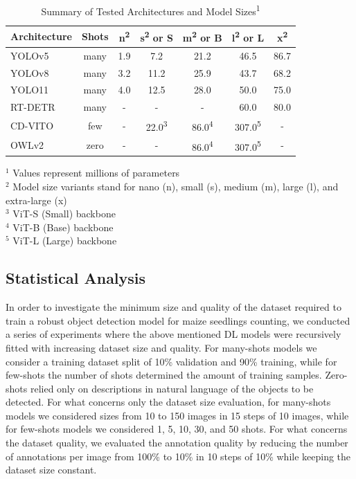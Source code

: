 \documentclass{article}
\begin{document}
\begin{table}[h]
  \caption{Summary of Tested Architectures and Model Sizes\textsuperscript{1}}
  \label{tab:architectures}
  \centering
  \begin{tabular}{lcccccc}
  \hline
  \textbf{Architecture} &\textbf{Shots} & \textbf{n\textsuperscript{2}} & \textbf{s\textsuperscript{2} or S} & \textbf{m\textsuperscript{2} or B} & \textbf{l\textsuperscript{2} or L} & \textbf{x\textsuperscript{2}} \\
  \hline
  YOLOv5 & many & 1.9 & 7.2 & 21.2 & 46.5 & 86.7 \\
  YOLOv8 & many & 3.2 & 11.2 & 25.9 & 43.7 & 68.2 \\
  YOLO11 & many & 4.0 & 12.5 & 28.0 & 50.0 & 75.0 \\
  RT-DETR & many & - & - & - & 60.0 & 80.0 \\
  CD-VITO & few & - & 22.0\textsuperscript{3} & 86.0\textsuperscript{4} & 307.0\textsuperscript{5} & - \\
  OWLv2 & zero & - & - & 86.0\textsuperscript{4} & 307.0\textsuperscript{5} & - \\
  \hline
  \end{tabular}
  
  \footnotesize{$^1$ Values represent millions of parameters\\
  $^2$ Model size variants stand for nano (n), small (s), medium (m), large (l), and extra-large (x)\\
  $^3$ ViT-S (Small) backbone\\
  $^4$ ViT-B (Base) backbone\\
  $^5$ ViT-L (Large) backbone}
\end{table}

\subsection{Statistical Analysis}
In order to investigate the minimum size and quality of the dataset required to train 
a robust object detection model for maize seedlings counting, we conducted a series of experiments
where the above mentioned DL models were recursively fitted with increasing dataset size and quality.
For many-shots models we consider a training 
dataset split of 10\% validation and 90\% training, while for few-shots the number of shots
determined the amount of training samples. Zero-shots relied only on descriptions 
in natural language of the objects to be detected.
For what concerns only the dataset size evaluation, for many-shots models we considered
sizes from 10 to 150 images in 15 steps of 10 images, while for few-shots models we considered
1, 5, 10, 30, and 50 shots.
For what concerns the dataset quality, we evaluated the annotation quality by reducing
the number of annotations per image from 100\% to 10\% in 10 steps of 10\% while
keeping the dataset size constant.
\end{document}
